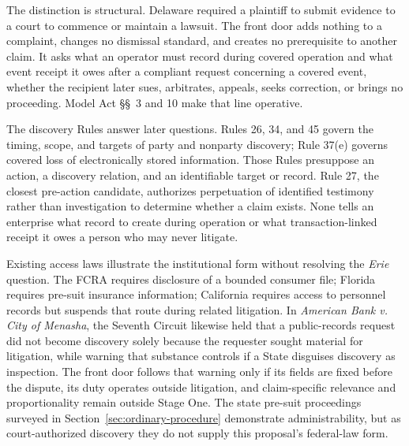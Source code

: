 The distinction is structural. Delaware required a plaintiff to submit evidence to a court to commence or maintain a lawsuit. The front door adds nothing to a complaint, changes no dismissal standard, and creates no prerequisite to another claim. It asks what an operator must record during covered operation and what event receipt it owes after a compliant request concerning a covered event, whether the recipient later sues, arbitrates, appeals, seeks correction, or brings no proceeding. Model Act \S\S~3 and 10 make that line operative.

The discovery Rules answer later questions. Rules 26, 34, and 45 govern the timing, scope, and targets of party and nonparty discovery; Rule 37(e) governs covered loss of electronically stored information. Those Rules presuppose an action, a discovery relation, and an identifiable target or record. Rule 27, the closest pre-action candidate, authorizes perpetuation of identified testimony rather than investigation to determine whether a claim exists. None tells an enterprise what record to create during operation or what transaction-linked receipt it owes a person who may never litigate.

Existing access laws illustrate the institutional form without resolving the \emph{Erie} question. The FCRA requires disclosure of a bounded consumer file; Florida requires pre-suit insurance information; California requires access to personnel records but suspends that route during related litigation. In \emph{American Bank v. City of Menasha}, the Seventh Circuit likewise held that a public-records request did not become discovery solely because the requester sought material for litigation, while warning that substance controls if a State disguises discovery as inspection. The front door follows that warning only if its fields are fixed before the dispute, its duty operates outside litigation, and claim-specific relevance and proportionality remain outside Stage One. The state pre-suit proceedings surveyed in Section~\ref{sec:ordinary-procedure} demonstrate administrability, but as court-authorized discovery they do not supply this proposal's federal-law form.

